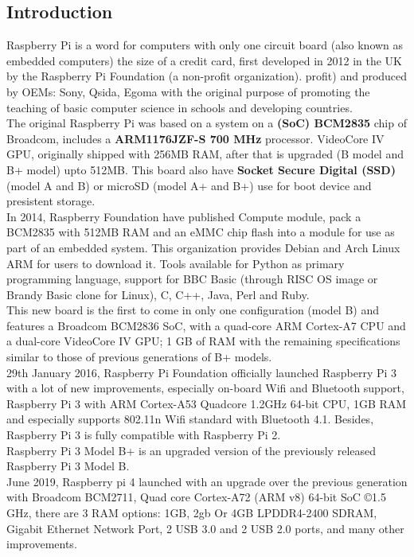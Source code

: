     \subsection{Introduction}
        Raspberry Pi is a word for computers with only one circuit board (also known as embedded computers) the size of a credit card, first developed in 2012 in the UK by the Raspberry Pi 
        Foundation (a non-profit organization). profit) and produced by OEMs: Sony, Qsida, Egoma with the original purpose of promoting the teaching of basic computer science in schools and 
        developing countries. \\
        \vspace{3mm}
        The original Raspberry Pi was based on a system on a \textbf{(SoC) BCM2835} chip of Broadcom, includes a \textbf{ARM1176JZF-S 700 MHz} processor. VideoCore IV GPU, originally shipped with 
        256MB RAM, after that is upgraded (B model and B+ model) upto 512MB. This board also have \textbf{Socket Secure Digital (SSD)} (model A and B) or microSD (model A+ and B+) use for 
        boot device and presistent storage. \\
        \vspace{3mm}
        In 2014, Raspberry Foundation have published Compute module, pack a BCM2835 with 512MB RAM and an eMMC chip flash into a module for use as part of an embedded system. This organization provides 
        Debian and Arch Linux ARM for users to download it. Tools available for Python as primary programming language, support for BBC Basic (through RISC OS image or Brandy Basic clone for Linux), 
        C, C++, Java, Perl and Ruby. \\ 
        \vspace{3mm}
        This new board is the first to come in only one configuration (model B) and features a Broadcom BCM2836 SoC, with a quad-core ARM Cortex-A7 CPU and a dual-core VideoCore IV GPU; 1 GB of RAM with 
        the remaining specifications similar to those of previous generations of B+ models. \\
        \vspace{3mm}
        29th January 2016, Raspberry Pi Foundation officially launched Raspberry Pi 3 with a lot of new improvements, especially on-board Wifi and Bluetooth support, Raspberry Pi 3 with ARM Cortex-A53 Quadcore 1.2GHz 64-bit 
        CPU, 1GB RAM and especially supports 802.11n Wifi standard with Bluetooth 4.1. Besides, Raspberry Pi 3 is fully compatible with Raspberry Pi 2. \\ 
        \vspace{3mm}
        Raspberry Pi 3 Model B+ is an upgraded version of the previously released Raspberry Pi 3 Model B. \\ 
        \vspace{3mm}
        June 2019, Raspberry pi 4 launched with an upgrade over the previous generation with Broadcom BCM2711, Quad core Cortex-A72 (ARM v8) 64-bit SoC \copyright 1.5 GHz, there are 3 RAM options: 1GB, 2gb Or 4GB LPDDR4-2400 SDRAM, 
        Gigabit Ethernet Network Port, 2 USB 3.0 and 2 USB 2.0 ports, and many other improvements.

